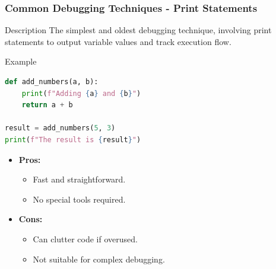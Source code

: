 \documentclass{beamer}
\begin{document}
\begin{frame}[fragile]
    \frametitle{Common Debugging Techniques - Print Statements}
    \begin{block}{Description}
        The simplest and oldest debugging technique, involving print statements to output variable values and track execution flow.
    \end{block}
    
    \begin{block}{Example}
        \begin{lstlisting}[language=Python]
def add_numbers(a, b):
    print(f"Adding {a} and {b}")
    return a + b

result = add_numbers(5, 3)
print(f"The result is {result}")
        \end{lstlisting}
    \end{block}

    \begin{itemize}
        \item \textbf{Pros:}
        \begin{itemize}
            \item Fast and straightforward.
            \item No special tools required.
        \end{itemize}
        \item \textbf{Cons:}
        \begin{itemize}
            \item Can clutter code if overused.
            \item Not suitable for complex debugging.
        \end{itemize}
    \end{itemize}
\end{frame}
\end{document}
